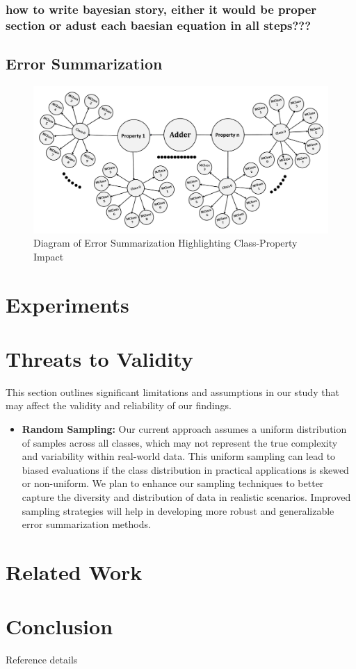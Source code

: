 \documentclass[10pt, conference, a4paper, final]{IEEEtran}
\begin{document}
 
\subsubsection{how to write bayesian story, either it would be proper section or adust each baesian equation in all steps??? }
\subsection{Error Summarization}

\begin{figure}[H]
    \centering
    \includegraphics[width=\linewidth]{paper_images/step5.pdf}
    \caption{Diagram of Error Summarization Highlighting Class-Property Impact}
    \label{fig:error-summarization}
\end{figure}





\section{Experiments}


\section{Threats to Validity}

This section outlines significant limitations and assumptions in our study that may affect the validity and reliability of our findings.

\begin{itemize}
    \item \textbf{Random Sampling:} Our current approach assumes a uniform distribution of samples across all classes, which may not represent the true complexity and variability within real-world data. This uniform sampling can lead to biased evaluations if the class distribution in practical applications is skewed or non-uniform. We plan to enhance our sampling techniques to better capture the diversity and distribution of data in realistic scenarios. Improved sampling strategies will help in developing more robust and generalizable error summarization methods.
\end{itemize}


\section{Related Work}

\section{Conclusion}

\begin{thebibliography}{01}
     Reference details
\end{thebibliography}
\end{document}

